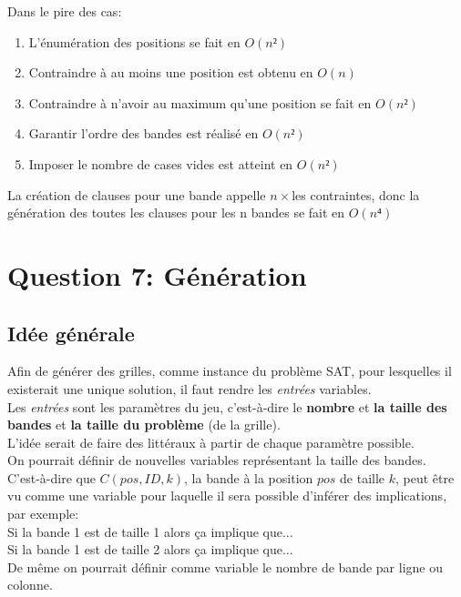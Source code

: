 \documentclass[a4paper,12pt]{report}
\begin{document}
Dans le pire des cas:
\begin{enumerate}
\item L'énumération des positions se fait en $O(n²)$
\item Contraindre à au moins une position est obtenu en $O(n)$
\item Contraindre à n'avoir au maximum qu'une position se fait en $O(n²)$
\item Garantir l'ordre des bandes est réalisé en $O(n²)$
\item Imposer le nombre de cases vides est atteint en $O(n²)$\\
\end{enumerate}
La création de clauses pour une bande appelle $n\times$les contraintes, donc la génération des toutes les clauses pour les n bandes se fait en $O(n⁴)$



\chapter{Question 7: Génération}
\section{Idée générale}
Afin de générer des grilles, comme instance du problème SAT, pour lesquelles il existerait une unique solution, il faut rendre les \textit{entrées} variables.\\
Les \textit{entrées} sont les paramètres du jeu, c'est-à-dire le \textbf{nombre} et \textbf{la taille des bandes} et \textbf{la taille du problème} (de la grille).\\

L'idée serait de faire des littéraux à partir de chaque paramètre possible.\\ 

On pourrait définir de nouvelles variables représentant la taille des bandes.\\ 
C'est-à-dire que $C(pos,ID,k)$, la bande à la position $pos$ de taille $k$, peut être vu comme une variable pour laquelle il sera possible d'inférer des implications, par exemple:\\ Si la bande 1 est de taille 1 alors ça implique que...\\
Si la bande 1 est de taille 2 alors ça implique que...\\

De même on pourrait définir comme variable le nombre de bande par ligne ou colonne.\\
\end{document}

